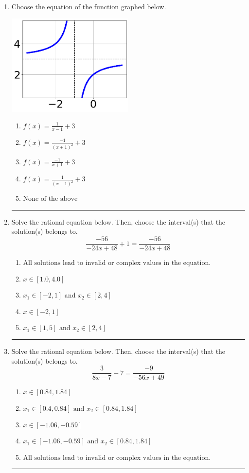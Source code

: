 \documentclass[14pt]{extbook}
\newcommand{\litem}[1]{\item#1\hspace*{-1cm}\rule{\textwidth}{0.4pt}}
\begin{document}
\begin{enumerate}
{\begin{enumerate}[label=\Alph*.]
\end{enumerate} }
\litem{
Choose the equation of the function graphed below.
\begin{center}
    \includegraphics[width=0.5\textwidth]{../Figures/rationalGraphToEquationC.png}
\end{center}
\begin{enumerate}[label=\Alph*.]
\item \( f(x) = \frac{1}{x - 1} + 3 \)
\item \( f(x) = \frac{-1}{(x + 1)^2} + 3 \)
\item \( f(x) = \frac{-1}{x + 1} + 3 \)
\item \( f(x) = \frac{1}{(x - 1)^2} + 3 \)
\item \( \text{None of the above} \)

\end{enumerate} }
\litem{
Solve the rational equation below. Then, choose the interval(s) that the solution(s) belongs to.\[ \frac{-56}{-24x + 48} + 1 = \frac{-56}{-24x + 48} \]\begin{enumerate}[label=\Alph*.]
\item \( \text{All solutions lead to invalid or complex values in the equation.} \)
\item \( x \in [1.0,4.0] \)
\item \( x_1 \in [-2, 1] \text{ and } x_2 \in [2,4] \)
\item \( x \in [-2,1] \)
\item \( x_1 \in [1, 5] \text{ and } x_2 \in [2,4] \)

\end{enumerate} }
\litem{
Solve the rational equation below. Then, choose the interval(s) that the solution(s) belongs to.\[ \frac{3}{8x -7} + 7 = \frac{-9}{-56x + 49} \]\begin{enumerate}[label=\Alph*.]
\item \( x \in [0.84,1.84] \)
\item \( x_1 \in [0.4, 0.84] \text{ and } x_2 \in [0.84,1.84] \)
\item \( x \in [-1.06,-0.59] \)
\item \( x_1 \in [-1.06, -0.59] \text{ and } x_2 \in [0.84,1.84] \)
\item \( \text{All solutions lead to invalid or complex values in the equation.} \)

\end{enumerate} }
\end{enumerate}
\end{document}
